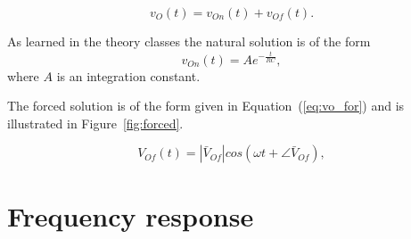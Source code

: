 \begin{equation}
  v_O(t) = v_{On}(t) + v_{Of}(t).
  \label{eq:vo_sol}
\end{equation}

As learned in the theory classes the natural solution is of the form
\begin{equation}
  v_{On}(t) = Ae^{-\frac{t}{RC}},
  \label{eq:vo_nat}
\end{equation}
where $A$ is an integration constant.

The forced solution is of the form given in Equation~(\ref{eq:vo_for}) and is
illustrated in Figure~\ref{fig:forced}.

\begin{equation}
  V_{Of}(t) = |\bar{V}_{Of}| cos(\omega t + \angle \bar{V}_{Of}),
  \label{eq:vo_for}
\end{equation}

\lipsum[1-1]



\section{Frequency response}

\lipsum[1-1]


